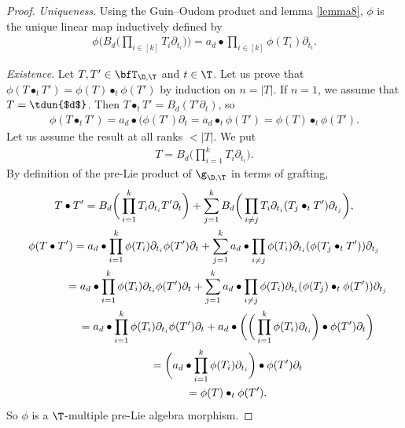 \begin{proof} \textit{Uniqueness}. Using the Guin--Oudom product and lemma \ref{lemma8},
$\phi$ is the unique linear map inductively defined by
\begin{gather*}
\phi\bigg(B_d\bigg(\prod_{i\in[k]}T_i \partial_{t_i}\bigg)\bigg)
=a_d \bullet \prod_{i\in [k]} \phi(T_i) \partial_{t_i}.
\end{gather*}

\textit{Existence}. Let $T,T'\in \bfT_{\D,\T}$ and $t\in \T$. Let us prove that $\phi(T\bullet_t T')=\phi(T)\bullet_t \phi(T')$
by induction on $n=|T|$. If $n=1$, we assume that $T=\tdun{$d$}$. Then $T\bullet_t T'=B_d(T'\partial_t)$, so
\begin{gather*}
\phi(T\bullet_t T')=a_d\bullet (\phi(T')\partial_t=a_d \bullet_t \phi(T')=\phi(T)\bullet_t \phi(T').
\end{gather*}
Let us assume the result at all ranks $<|T|$. We put
\begin{gather*}
T=B_d\bigg(\prod_{i=1}^k T_i\partial_{t_i}\bigg).
\end{gather*}
By definition of the pre-Lie product of $\g_{\D,\T}$ in terms of grafting,
\begin{gather*}
T\bullet T'=B_d\bigg(\prod_{i=1}^k T_i \partial_{t_i} T'\partial_t\bigg)+\sum_{j=1}^k B_d\bigg(\prod_{i\neq j} T_i\partial_{t_i} (T_j\bullet_t T')\partial_{t_j}\bigg),
\\
\phi(T\bullet T')=a_d\bullet \prod_{i=1}^k \phi(T_i)\partial_{t_i}\phi(T')\partial_t
+\sum_{j=1}^k a_d\bullet \prod_{i\neq j} \phi(T_i)\partial_{t_i} (\phi(T_j\bullet_t T'))\partial_{t_j}
\\ \hphantom{\phi(T\bullet T')}
{}=a_d\bullet \prod_{i=1}^k \phi(T_i)\partial_{t_i}\phi(T')\partial_t
+\sum_{j=1}^k a_d\bullet \prod_{i\neq j} \phi(T_i)\partial_{t_i} (\phi(T_j)\bullet_t \phi(T'))\partial_{t_j}
\\ \hphantom{\phi(T\bullet T')}
{}=a_d\bullet \prod_{i=1}^k \phi(T_i)\partial_{t_i}\phi(T')\partial_t+a_d\bullet\bigg(\bigg(\prod_{i=1}^k
\phi(T_i)\partial_{t_i}\bigg)\bullet \phi(T')\partial_t\bigg)
\\ \hphantom{\phi(T\bullet T')}
{}=\bigg(a_d\bullet\prod_{i=1}^k \phi(T_i)\partial_{t_i} \bigg)\bullet \phi(T')\partial_t
\\ \hphantom{\phi(T\bullet T')}
{}=\phi(T)\bullet_t \phi(T').
\end{gather*}
So $\phi$ is a $\T$-multiple pre-Lie algebra morphism. \end{proof}

